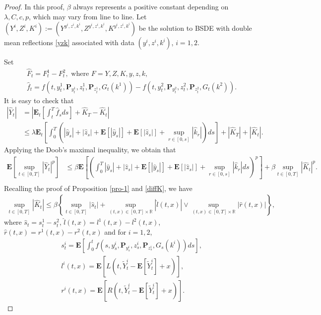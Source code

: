 \documentclass[10pt,a4paper]{amsart}
\def \E{\mathbf{E}}
\def \P{\mathbf{P}}
\begin{document}
\begin{proof}
In this proof,  $\beta$ always represents a positive constant depending on $\lambda,C,c,p$, which may vary from line to line. Let $(Y^i,Z^i,K^i):=(Y^{y^i,z^i,k^i},Z^{y^i,z^i,k^i},K^{y^i,z^i,k^i})$ be the solution to BSDE  with double mean reflections \eqref{yzk} associated with data $(y^i,z^i,k^i)$, $i=1,2$.

Set
\begin{align*}
&\hat{F}_t=F^1_t-F^2_t, \textrm{ where } F=Y,Z,K,y,z,k, \\ &\hat{f}_t=f(t,y^1_t,\P_{y^1_t},z^1_t,\P_{z^1_t},G_t(k^1))-f(t,y^2_t,\P_{y^2_t},z^2_t,\P_{z^2_t},G_t(k^2)).
\end{align*}
It is easy to check that 
\begin{align*}
|\hat{Y}_t|&=\left|\E_t\left[\int_t^T \hat{f}_sds\right]+\hat{K}_T-\hat{K}_t\right|\\
&\leq \lambda \E_t\left[\int_0^T \left(|\hat{y}_s|+|\hat{z}_s|+\E[|\hat{y}_s|]+\E[|\hat{z}_s|]+\sup_{r\in[0,s]}|\hat{k}_r|\right)ds \right]+|\hat{K}_T|+|\hat{K}_t|.
\end{align*}
Applying the Doob's maximal inequality, we obtain that  
\begin{equation}\begin{split}\label{differY}
 \E\left[\sup_{t\in[0,T]}|\hat{Y}_t|^p\right]
 &\leq \beta \E\left[\left(\int_{0}^{T}|\hat{y}_s|+|\hat{z}_s|+\E[|\hat{y}_s|]+\E[|\hat{z}_s|]+\sup_{r\in[0,s]}|\hat{k}_r|ds\right)^p\right]+\beta \sup_{t\in[0,T]}|\hat{K}_t|^p.\\   
\end{split}
\end{equation}
Recalling the proof of Proposition \ref{pro-1} and \eqref{diffK}, we have
\begin{align*}
\sup_{t\in[0,T]}|\hat{K}_t|\leq  \beta \left\{\sup_{t\in[0,T]}|\hat{s}_t|+\sup_{(t,x)\in[0,T]\times\mathbb{R}}|\hat{l}(t,x)|\vee \sup_{(t,x)\in[0,T]\times\mathbb{R}} |\hat{r}(t,x)|\right\},
\end{align*}
where $\hat{s}_t=s^1_t-s^2_t$, $\hat{l}(t,x)=l^1(t,x)-l^2(t,x)$, $\hat{r}(t,x)=r^1(t,x)-r^2(t,x)$ and for $i=1,2$, 
\begin{align*}
&s^i_t=\E\left[\int_0^t f\left(s,y^i_s,\P_{y^i_s},z^i_s,\P_{z^i_s},G_s(k^i)\right)ds\right], \\ 
&l^i(t,x)=\E\left[L\left(t,\widetilde{Y}^i_t-\E[\widetilde{Y}^i_t]+x\right)\right],\\  &r^i(t,x)=\E\left[R\left(t,\widetilde{Y}^i_t-\E[\widetilde{Y}^i_t]+x\right)\right].
\end{align*}

\end{proof}
\end{document}
